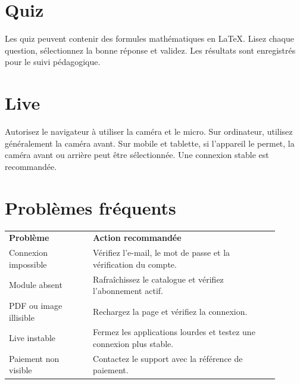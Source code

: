 \documentclass[11pt,a4paper]{article}
\begin{document}
\section{Quiz}
Les quiz peuvent contenir des formules mathématiques en LaTeX. Lisez chaque question, sélectionnez la bonne réponse et validez. Les résultats sont enregistrés pour le suivi pédagogique.

\section{Live}
Autorisez le navigateur à utiliser la caméra et le micro. Sur ordinateur, utilisez généralement la caméra avant. Sur mobile et tablette, si l'appareil le permet, la caméra avant ou arrière peut être sélectionnée. Une connexion stable est recommandée.

\section{Problèmes fréquents}
\begin{longtable}{p{0.28\linewidth}p{0.62\linewidth}}
 \textbf{Problème} & \textbf{Action recommandée} \\
Connexion impossible & Vérifiez l'e-mail, le mot de passe et la vérification du compte. \\
Module absent & Rafraîchissez le catalogue et vérifiez l'abonnement actif. \\
PDF ou image illisible & Rechargez la page et vérifiez la connexion. \\
Live instable & Fermez les applications lourdes et testez une connexion plus stable. \\
Paiement non visible & Contactez le support avec la référence de paiement. \\
\end{longtable}

\PAContactBlock
\end{document}
